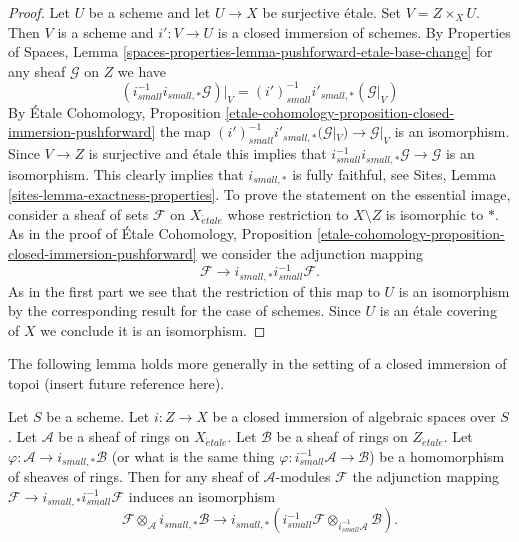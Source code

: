 \begin{proof}
Let $U$ be a scheme and let $U \to X$ be surjective \'etale.
Set $V = Z \times_X U$. Then $V$ is a scheme and $i' : V \to U$ is
a closed immersion of schemes. By
Properties of Spaces,
Lemma \ref{spaces-properties-lemma-pushforward-etale-base-change}
for any sheaf $\mathcal{G}$ on $Z$ we have
$$
(i_{small}^{-1}i_{small, *}\mathcal{G})|_V =
(i')_{small}^{-1}i'_{small, *}(\mathcal{G}|_V)
$$
By
\'Etale Cohomology, Proposition
\ref{etale-cohomology-proposition-closed-immersion-pushforward}
the map
$(i')_{small}^{-1}i'_{small, *}(\mathcal{G}|_V) \to \mathcal{G}|_V$
is an isomorphism. Since $V \to Z$ is surjective and \'etale this implies
that $i_{small}^{-1}i_{small, *}\mathcal{G} \to \mathcal{G}$ is an
isomorphism. This clearly implies that $i_{small, *}$ is fully faithful, see
Sites, Lemma \ref{sites-lemma-exactness-properties}.
To prove the statement on the essential image, consider a sheaf of sets
$\mathcal{F}$ on $X_{\acute{e}tale}$ whose restriction to $X \setminus Z$ is
isomorphic to $*$. As in the proof of
\'Etale Cohomology, Proposition
\ref{etale-cohomology-proposition-closed-immersion-pushforward}
we consider the adjunction mapping
$$
\mathcal{F} \longrightarrow i_{small, *}i_{small}^{-1}\mathcal{F}.
$$
As in the first part we see that the restriction of this map to
$U$ is an isomorphism by the corresponding result for the case of
schemes. Since $U$ is an \'etale covering of $X$ we
conclude it is an isomorphism.
\end{proof}

\noindent
The following lemma holds more generally in the setting of a closed
immersion of topoi (insert future reference here).

\begin{lemma}
\label{lemma-closed-immersion-rings}
Let $S$ be a scheme. Let $i : Z \to X$ be a closed immersion of algebraic
spaces over $S$. Let $\mathcal{A}$ be a sheaf of rings on $X_{\acute{e}tale}$.
Let $\mathcal{B}$ be a sheaf of rings on $Z_{\acute{e}tale}$.
Let $\varphi : \mathcal{A} \to i_{small, *}\mathcal{B}$
(or what is the same thing
$\varphi : i_{small}^{-1}\mathcal{A} \to \mathcal{B}$)
be a homomorphism of sheaves of rings. Then for any sheaf of
$\mathcal{A}$-modules $\mathcal{F}$ the adjunction mapping
$\mathcal{F} \to i_{small, *}i_{small}^{-1}\mathcal{F}$
induces an isomorphism
$$
\mathcal{F} \otimes_\mathcal{A} i_{small, *}\mathcal{B}
\longrightarrow
i_{small, *}(i^{-1}_{small}\mathcal{F}
\otimes_{i_{small}^{-1}\mathcal{A}}
\mathcal{B}).
$$
\end{lemma}

